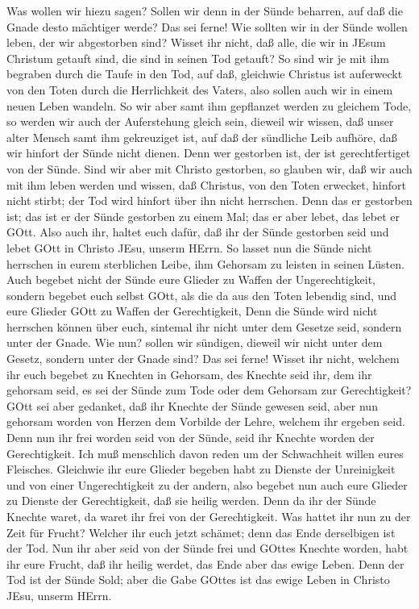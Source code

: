  Was wollen wir hiezu sagen? Sollen wir denn in der Sünde
beharren, auf daß die Gnade desto mächtiger werde?  Das sei
ferne! Wie sollten wir in der Sünde wollen leben, der wir abgestorben
sind?  Wisset ihr nicht, daß alle, die wir in JEsum Christum
getauft sind, die sind in seinen Tod getauft?  So sind wir
je mit ihm begraben durch die Taufe in den Tod, auf daß, gleichwie
Christus ist auferweckt von den Toten durch die Herrlichkeit des Vaters,
also sollen auch wir in einem neuen Leben wandeln.  So wir
aber samt ihm gepflanzet werden zu gleichem Tode, so werden wir auch der
Auferstehung gleich sein,  dieweil wir wissen, daß unser
alter Mensch samt ihm gekreuziget ist, auf daß der sündliche Leib
aufhöre, daß wir hinfort der Sünde nicht dienen.  Denn wer
gestorben ist, der ist gerechtfertiget von der Sünde.  Sind
wir aber mit Christo gestorben, so glauben wir, daß wir auch mit ihm
leben werden  und wissen, daß Christus, von den Toten
erwecket, hinfort nicht stirbt; der Tod wird hinfort über ihn nicht
herrschen.  Denn das er gestorben ist; das ist er der Sünde
gestorben zu einem Mal; das er aber lebet, das lebet er GOtt.
 Also auch ihr, haltet euch dafür, daß ihr der Sünde
gestorben seid und lebet GOtt in Christo JEsu, unserm HErrn.
 So lasset nun die Sünde nicht herrschen in eurem
sterblichen Leibe, ihm Gehorsam zu leisten in seinen Lüsten.
 Auch begebet nicht der Sünde eure Glieder zu Waffen der
Ungerechtigkeit, sondern begebet euch selbst GOtt, als die da aus den
Toten lebendig sind, und eure Glieder GOtt zu Waffen der Gerechtigkeit,
 Denn die Sünde wird nicht herrschen können über euch,
sintemal ihr nicht unter dem Gesetze seid, sondern unter der Gnade.
 Wie nun? sollen wir sündigen, dieweil wir nicht unter dem
Gesetz, sondern unter der Gnade sind? Das sei ferne! 
Wisset ihr nicht, welchem ihr euch begebet zu Knechten in Gehorsam, des
Knechte seid ihr, dem ihr gehorsam seid, es sei der Sünde zum Tode oder
dem Gehorsam zur Gerechtigkeit?  GOtt sei aber gedanket,
daß ihr Knechte der Sünde gewesen seid, aber nun gehorsam worden von
Herzen dem Vorbilde der Lehre, welchem ihr ergeben seid. 
Denn nun ihr frei worden seid von der Sünde, seid ihr Knechte worden der
Gerechtigkeit.  Ich muß menschlich davon reden um der
Schwachheit willen eures Fleisches. Gleichwie ihr eure Glieder begeben
habt zu Dienste der Unreinigkeit und von einer Ungerechtigkeit zu der
andern, also begebet nun auch eure Glieder zu Dienste der Gerechtigkeit,
daß sie heilig werden.  Denn da ihr der Sünde Knechte
waret, da waret ihr frei von der Gerechtigkeit.  Was hattet
ihr nun zu der Zeit für Frucht? Welcher ihr euch jetzt schämet; denn das
Ende derselbigen ist der Tod.  Nun ihr aber seid von der
Sünde frei und GOttes Knechte worden, habt ihr eure Frucht, daß ihr
heilig werdet, das Ende aber das ewige Leben.  Denn der Tod
ist der Sünde Sold; aber die Gabe GOttes ist das ewige Leben in Christo
JEsu, unserm HErrn.


